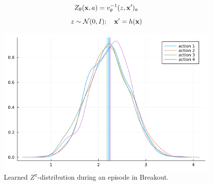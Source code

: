 \documentclass[twoside]{article}
\begin{document}
\begin{equation}
  Z_\theta(\textbf{x},a) = v_\theta^{-1}(z, \textbf{x}^\prime)_a
\end{equation}
\begin{equation*}
  z \sim \mathcal{N}(0, I); \quad \textbf{x}^\prime = h(\textbf{x})
\end{equation*}

\begin{figure}[ht]
\vspace{.3in}
\includegraphics[width=\columnwidth]{qdistr_6100.png}
\vspace{.3in}
\caption{Learned \(Z^\pi\)-distribution during an episode in Breakout.}
\end{figure}





\end{document}
